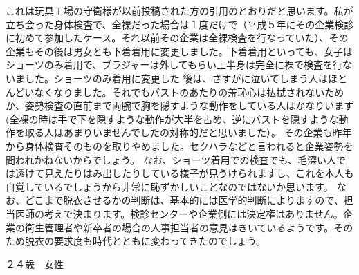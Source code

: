 これは玩具工場の守衛様が以前投稿された方の引用のとおりだと思います。私が立ち会った身体検査で、全裸だった場合は１度だけで（平成５年にその企業検診に初めて参加したケース。それ以前その企業は全裸検査を行なっていた）、その企業もその後は男女とも下着着用に変更しました。下着着用といっても、女子はショーツのみ着用で、ブラジャーは外してもらい上半身は完全に裸で検査を行ないました。ショーツのみ着用に変更した
後は、さすがに泣いてしまう人はほとんどいなくなりました。それでもバストのあたりの羞恥心は払拭されないためか、姿勢検査の直前まで両腕で胸を隠すような動作をしている人はかなりいます(全裸の時は手で下を隠すような動作が大半を占め、逆にバストを隠すような動作を取る人はあまりいませんでしたの対称的だと思いました）。
その企業も昨年から身体検査そのものを取りやめました。セクハラなどと言われると企業姿勢を問われかねないからでしょう。
なお、ショーツ着用での検査でも、毛深い人では透けて見えたりはみ出したりしている様子が見うけられますし、これを本人も自覚しているでしょうから非常に恥ずかしいことなのではないか思います。
なお、どこまで脱衣させるかの判断は、基本的には医学的判断によりますので、担当医師の考えで決まります。検診センターや企業側には決定権はありません。企業の衛生管理者や新卒者の場合の人事担当者の意見はきいているようです。そのため脱衣の要求度も時代とともに変わってきたのでしょう。


２４歳　女性

